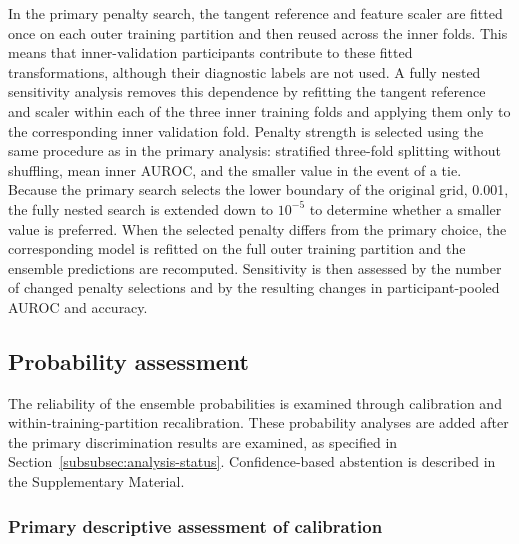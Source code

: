 In the primary penalty search, the tangent reference and feature scaler are fitted once on each outer training partition and then reused across the inner folds. This means that inner-validation participants contribute to these fitted transformations, although their diagnostic labels are not used. A fully nested sensitivity analysis removes this dependence by refitting the tangent reference and scaler within each of the three inner training folds and applying them only to the corresponding inner validation fold. Penalty strength is selected using the same procedure as in the primary analysis: stratified three-fold splitting without shuffling, mean inner AUROC, and the smaller value in the event of a tie. Because the primary search selects the lower boundary of the original grid, 0.001, the fully nested search is extended down to $10^{-5}$ to determine whether a smaller value is preferred. When the selected penalty differs from the primary choice, the corresponding model is refitted on the full outer training partition and the ensemble predictions are recomputed. Sensitivity is then assessed by the number of changed penalty selections and by the resulting changes in participant-pooled AUROC and accuracy.

\subsection{Probability assessment}
\label{subsec:probability-assessment}
The reliability of the ensemble probabilities is examined through calibration and within-training-partition recalibration. These probability analyses are added after the primary discrimination results are examined, as specified in Section~\ref{subsubsec:analysis-status}. Confidence-based abstention is described in the Supplementary Material.

\subsubsection{Primary descriptive assessment of calibration}
\label{subsubsec:calibration-assessment}

